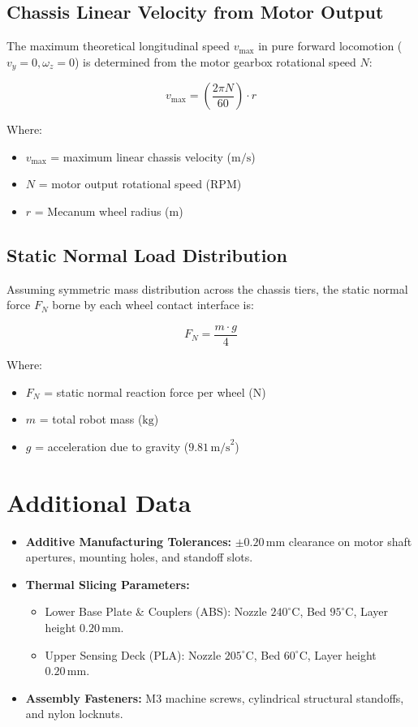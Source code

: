 \subsection*{Chassis Linear Velocity from Motor Output}
The maximum theoretical longitudinal speed $v_{\text{max}}$ in pure forward locomotion ($v_y = 0, \omega_z = 0$) is determined from the motor gearbox rotational speed $N$:

\begin{equation}
    v_{\text{max}} = \left( \frac{2 \pi N}{60} \right) \cdot r
\end{equation}

Where:
\begin{itemize}
    \item $v_{\text{max}}$ = maximum linear chassis velocity ($\text{m/s}$)
    \item $N$ = motor output rotational speed ($\text{RPM}$)
    \item $r$ = Mecanum wheel radius ($\text{m}$)
\end{itemize}

\subsection*{Static Normal Load Distribution}
Assuming symmetric mass distribution across the chassis tiers, the static normal force $F_N$ borne by each wheel contact interface is:

\begin{equation}
    F_{N} = \frac{m \cdot g}{4}
\end{equation}

Where:
\begin{itemize}
    \item $F_N$ = static normal reaction force per wheel ($\text{N}$)
    \item $m$ = total robot mass ($\text{kg}$)
    \item $g$ = acceleration due to gravity ($9.81\,\text{m/s}^2$)
\end{itemize}

\section{Additional Data}
\begin{itemize}
    \item \textbf{Additive Manufacturing Tolerances:} $\pm 0.20\,\text{mm}$ clearance on motor shaft apertures, mounting holes, and standoff slots.
    \item \textbf{Thermal Slicing Parameters:}
    \begin{itemize}
        \item Lower Base Plate \& Couplers (ABS): Nozzle $240^\circ\text{C}$, Bed $95^\circ\text{C}$, Layer height $0.20\,\text{mm}$.
        \item Upper Sensing Deck (PLA): Nozzle $205^\circ\text{C}$, Bed $60^\circ\text{C}$, Layer height $0.20\,\text{mm}$.
    \end{itemize}
    \item \textbf{Assembly Fasteners:} M3 machine screws, cylindrical structural standoffs, and nylon locknuts.
\end{itemize}
